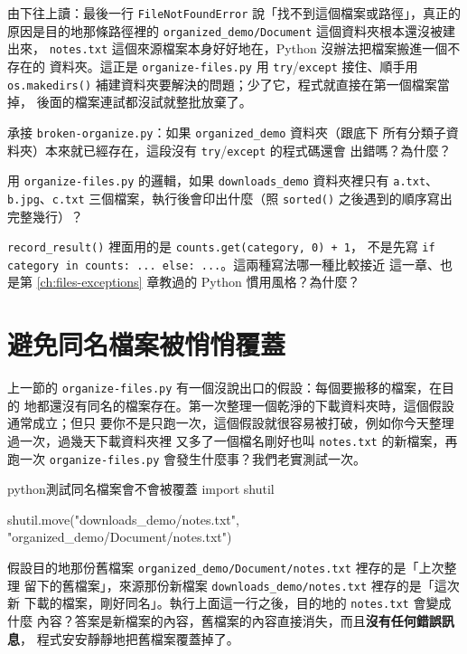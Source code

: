 由下往上讀：最後一行 \texttt{FileNotFoundError} 說「找不到這個檔案或路徑」，真正的
原因是目的地那條路徑裡的 \texttt{organized\_demo/Document} 這個資料夾根本還沒被建出來，
\texttt{notes.txt} 這個來源檔案本身好好地在，Python 沒辦法把檔案搬進一個不存在的
資料夾。這正是
\texttt{organize-files.py} 用 \texttt{try}/\texttt{except} 接住、順手用
\texttt{os.makedirs()} 補建資料夾要解決的問題；少了它，程式就直接在第一個檔案當掉，
後面的檔案連試都沒試就整批放棄了。

\begin{drills}[label=drills:move-files]
\item 承接 \texttt{broken-organize.py}：如果 \texttt{organized\_demo} 資料夾（跟底下
所有分類子資料夾）本來就已經存在，這段沒有 \texttt{try}/\texttt{except} 的程式碼還會
出錯嗎？為什麼？
\item 用 \texttt{organize-files.py} 的邏輯，如果 \texttt{downloads\_demo} 資料夾裡只有
\texttt{a.txt}、\texttt{b.jpg}、\texttt{c.txt} 三個檔案，執行後會印出什麼（照
\texttt{sorted()} 之後遇到的順序寫出完整幾行）？
\item \texttt{record\_result()} 裡面用的是 \texttt{counts.get(category, 0) + 1}，
不是先寫 \texttt{if category in counts: ... else: ...}。這兩種寫法哪一種比較接近
這一章、也是第 \ref{ch:files-exceptions} 章教過的 Python 慣用風格？為什麼？
\end{drills}

\section{避免同名檔案被悄悄覆蓋}
\label{sec:avoid-overwrite}

上一節的 \texttt{organize-files.py} 有一個沒說出口的假設：每個要搬移的檔案，在目的
地都還沒有同名的檔案存在。第一次整理一個乾淨的下載資料夾時，這個假設通常成立；但只
要你不是只跑一次，這個假設就很容易被打破，例如你今天整理過一次，過幾天下載資料夾裡
又多了一個檔名剛好也叫 \texttt{notes.txt} 的新檔案，再跑一次 \texttt{organize-files.py}
會發生什麼事？我們老實測試一次。

\begin{code}{python}{測試同名檔案會不會被覆蓋}
import shutil

shutil.move("downloads_demo/notes.txt", "organized_demo/Document/notes.txt")
\end{code}

假設目的地那份舊檔案 \texttt{organized\_demo/Document/notes.txt} 裡存的是「上次整理
留下的舊檔案」，來源那份新檔案 \texttt{downloads\_demo/notes.txt} 裡存的是「這次新
下載的檔案，剛好同名」。執行上面這一行之後，目的地的 \texttt{notes.txt} 會變成什麼
內容？答案是新檔案的內容，舊檔案的內容直接消失，而且\textbf{沒有任何錯誤訊息}，
程式安安靜靜地把舊檔案覆蓋掉了。

